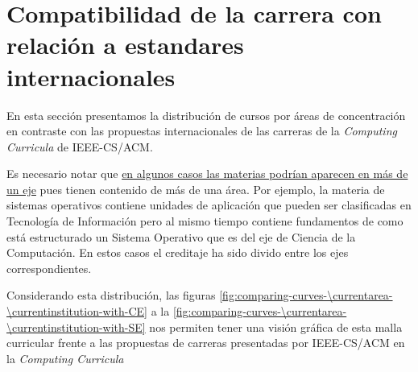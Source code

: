 \section{Compatibilidad de la carrera con relación a estandares internacionales}
En esta sección presentamos la distribución de cursos por áreas de concentración en 
contraste con las propuestas internacionales de las carreras de la \textit{Computing Curricula} 
de IEEE-CS/ACM.

Es necesario notar que \underline{en algunos casos las materias podrían aparecen en más de un eje} 
pues tienen contenido de más de una área. 
Por ejemplo, la materia de sistemas operativos contiene unidades de aplicación 
que pueden ser clasificadas en Tecnología de Información pero al mismo tiempo contiene fundamentos 
de como está estructurado un Sistema Operativo que es del eje de Ciencia de la Computación. 
En estos casos el creditaje ha sido divido entre los ejes correspondientes.


Considerando esta distribución, las figuras \ref{fig:comparing-curves-\currentarea-\currentinstitution-with-CE} 
a la \ref{fig:comparing-curves-\currentarea-\currentinstitution-with-SE} 
nos permiten tener una visión gráfica de esta malla curricular frente a las propuestas de 
carreras presentadas por IEEE-CS/ACM en la \textit{Computing Curricula}


\begin{landscape}

\end{landscape}

\begin{landscape}

\end{landscape}
